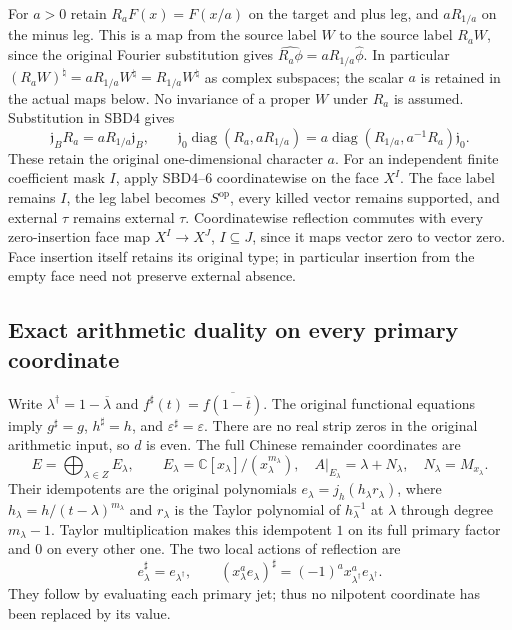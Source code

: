 For $a>0$ retain $R_aF(x)=F(x/a)$ on the target and plus leg,
and $aR_{1/a}$ on the minus leg. This is a map from the
source label $W$ to the source label $R_aW$, since the
original Fourier substitution gives
$\widehat{R_a\phi}=aR_{1/a}\widehat\phi$.
In particular
$(R_aW)^\natural=aR_{1/a}W^\natural=R_{1/a}W^\natural$
as complex subspaces; the scalar $a$ is retained in the
actual maps below. No invariance of a proper $W$ under
$R_a$ is assumed. Substitution in SBD4 gives
\[
 \mathfrak j_B R_a=aR_{1/a}\mathfrak j_B,\qquad
 \mathfrak j_0\operatorname{diag}(R_a,aR_{1/a})
   =a\operatorname{diag}(R_{1/a},a^{-1}R_a)\mathfrak j_0.
 \tag{SBD6}
\]
These retain the original one-dimensional character $a$.
For an independent finite coefficient mask $I$, apply SBD4--6
coordinatewise on the face $X^I$. The face label remains $I$,
the leg label becomes $S^{\mathrm{op}}$, every killed vector
remains supported, and external $\tau$ remains external $\tau$.
Coordinatewise reflection commutes with every zero-insertion face
map $X^I\to X^J$, $I\subseteq J$, since it maps vector zero
to vector zero. Face insertion itself retains its original type;
in particular insertion from the empty face need not preserve
external absence.

\subsection{Exact arithmetic duality on every primary coordinate}

Write $\lambda^\dagger=1-\overline\lambda$ and
$f^\sharp(t)=\overline{f(1-\overline t)}$.
The original functional equations imply $g^\sharp=g$,
$h^\sharp=h$, and $\varepsilon^\sharp=\varepsilon$.
There are no real strip zeros in the original arithmetic input,
so $d$ is even. The full Chinese remainder coordinates are
\[
 E=\bigoplus_{\lambda\in Z}E_\lambda,\qquad
 E_\lambda=\mathbb C[x_\lambda]/(x_\lambda^{m_\lambda}),
 \quad A|_{E_\lambda}=\lambda+N_\lambda,\quad N_\lambda=M_{x_\lambda}.
 \tag{SBD7}
\]
Their idempotents are the original polynomials
$e_\lambda=j_h(h_\lambda r_\lambda)$, where
$h_\lambda=h/(t-\lambda)^{m_\lambda}$ and $r_\lambda$ is the
Taylor polynomial of $h_\lambda^{-1}$ at $\lambda$ through
degree $m_\lambda-1$. Taylor multiplication makes this
idempotent $1$ on its full primary factor and $0$ on every other
one. The two local actions of reflection are
\[
 e_\lambda^\sharp=e_{\lambda^\dagger},\qquad
 (x_\lambda^a e_\lambda)^\sharp
       =(-1)^a x_{\lambda^\dagger}^a e_{\lambda^\dagger}.
 \tag{SBD8}
\]
They follow by evaluating each primary jet; thus no nilpotent
coordinate has been replaced by its value.

